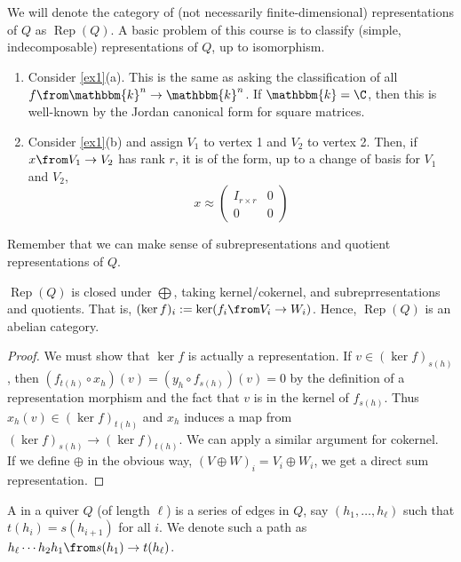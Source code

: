 \documentclass[11pt,leqno,oneside]{amsbook}
\numberwithin{thm}{section}
\newcommand{\bbk}{\mathbbm{k}} %
\newcommand{\Rep}{\operatorname{Rep}} %
\renewcommand{\Q}{Q} %
\begin{document}
We will denote the category of (not necessarily finite-dimensional)
representations of \(\Q\) as \(\Rep(\Q)\). A basic problem of this
course is to classify (simple, indecomposable) representations of
\(\Q\), up to isomorphism.
\begin{example}
  \begin{enumerate}
  \item Consider \ref{ex1}(a). This is the same as asking the classification
  of all \(f \from \bbk^n \to \bbk^n\). If \(\bbk = \C\), then this is
  well-known by the Jordan canonical form for square matrices.
  \item Consider \ref{ex1}(b) and assign \(V_1\) to vertex 1 and
    \(V_2\) to vertex 2. Then, if\(x \from V_1 \to V_2\) has rank
    \(r\), it is of the form, up to a
    change of basis for \(V_1\) and \(V_2\), \[
      x \approx \left(
        \begin{array}{cc}
          I_{r \times r}& 0 \\
          0 & 0
        \end{array}
      \right)
    \]
  \end{enumerate}
\end{example}
Remember that we can make sense of subrepresentations and quotient
representations of \(\Q\).
\begin{thm}
  \(\Rep(\Q)\) is closed under \(\bigoplus\), taking
  kernel/cokernel, and subreprresentations and quotients. That is, \((\ker f)_i := \ker(f_i \from V_i \to
  W_i)\). Hence, \(\Rep(\Q)\) is an abelian category.
\end{thm}
\begin{proof}
  We must show that \(\ker f\) is actually a representation. If
  \(v \in (\ker f)_{s(h)}\), then \((f_{t(h)} \circ x_h)(v) = (y_h \circ
  f_{s(h)})(v) = 0\) by the definition of a representation morphism
  and the fact that \(v\) is in the kernel of \(f_{s(h)}\). Thus
  \(x_h(v) \in (\ker f)_{t(h)}\) and \(x_h\) induces a map from
  \((\ker f)_{s(h)} \to (\ker f)_{t(h)}\). We can apply a similar
  argument for cokernel. \\

  If we define \(\oplus\) in the obvious way, \((V \oplus W)_i = V_i
  \oplus W_i\), we get a direct sum representation. 
\end{proof}
\begin{defn}
  A  in a quiver \(\Q\) (of length \(\ell\)) is a series of
  edges in \(\Q\), say \((h_1, \ldots, h_\ell)\) such that \(t(h_i) =
  s(h_{i+1})\) for all \(i\). We denote such a path as \(h_\ell \cdots
  h_2 h_1 \from s(h_1) \to t(h_\ell)\). 
\end{defn}
\end{document}
